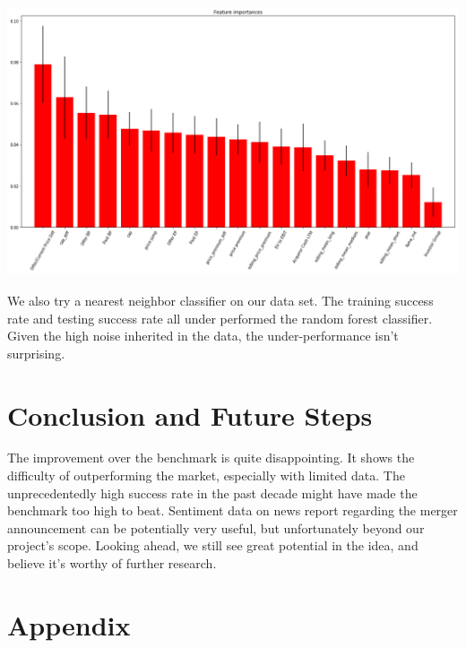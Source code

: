 \documentclass[12pt]{article}
\begin{document}
\begin{center}
\includegraphics[width=14cm, height=8cm]{Feature_Importance.png} 

\end{center}

We also try a nearest neighbor classifier on our data set. The training success rate and testing success rate all under performed the random forest classifier. Given the high noise inherited in the data, the under-performance isn't surprising.




\section{Conclusion and Future Steps }
\label{sec:conclusion}

The improvement over the benchmark is quite disappointing. It shows the difficulty of outperforming the market, especially with limited data. The unprecedentedly high success rate in the past decade might have made the benchmark too high to beat. Sentiment data on news report regarding the merger announcement can be potentially very useful, but unfortunately beyond our project's scope. Looking ahead, we still see great potential in the idea, and believe it's worthy of further research. 

\newpage 
\section{Appendix }
\label{sec:tables}
\end{document}
